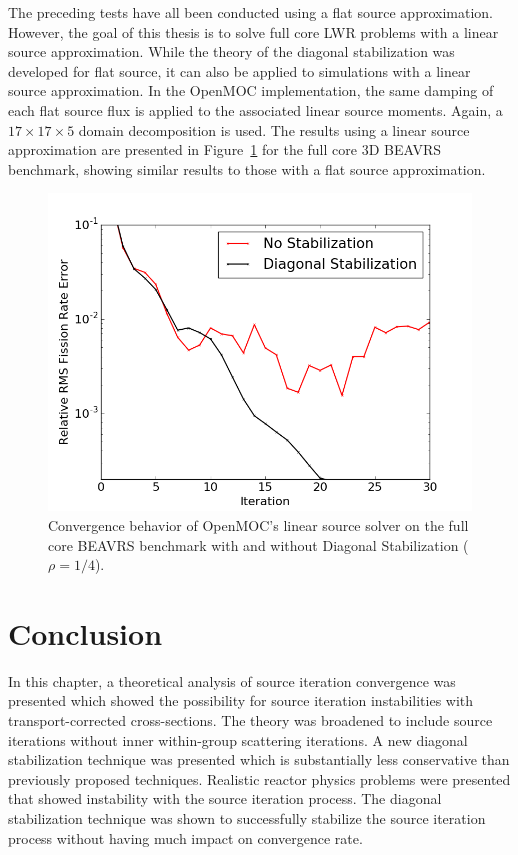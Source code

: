 The preceding tests have all been conducted using a flat source approximation. However, the goal of this thesis is to solve full core \ac{LWR} problems with a linear source approximation. While the theory of the diagonal stabilization was developed for flat source, it can also be applied to simulations with a linear source approximation. In the OpenMOC implementation, the same damping of each flat source flux is applied to the associated linear source moments. Again, a $17 \times 17 \times 5$ domain decomposition is used. The results using a linear source approximation are presented in Figure~\ref{fig:fc-3D-ls} for the full core 3D BEAVRS benchmark, showing similar results to those with a flat source approximation.

\begin{figure}[ht!]
	\centering
	\includegraphics[width=0.71\linewidth]{figures/convergence/full-core-3D-ls.png}
	\caption{Convergence behavior of OpenMOC's linear source solver on the full core \ac{BEAVRS} benchmark with and without Diagonal Stabilization ($\rho = 1/4$).}
	\label{fig:fc-3D-ls}
\end{figure}

\newpage
\section{Conclusion}
\label{sec:convergence-conclusion}

In this chapter, a theoretical analysis of source iteration convergence was presented which showed the possibility for source iteration instabilities with transport-corrected cross-sections. The theory was broadened to include source iterations without inner within-group scattering iterations. A new diagonal stabilization technique was presented which is substantially less conservative than previously proposed techniques. Realistic reactor physics problems were presented that showed instability with the source iteration process. The diagonal stabilization technique was shown to successfully stabilize the source iteration process without having much impact on convergence rate.

